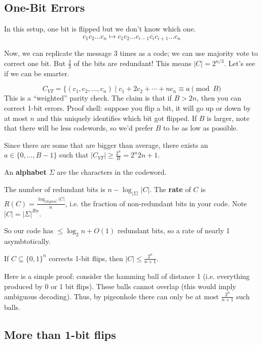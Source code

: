 \subsection{One-Bit Errors}

In this setup, one bit is flipped but we don't know which one.
\[ c_1 c_2 \dots c_n \mapsto c_1 c_2 \dots c_{i - 1} \overline{c_i} c_{i + 1} \dots c_n \]

Now, we can replicate the message 3 times as a code; we can use majority vote to correct one bit. But $\frac{2}{3}$ of the bits are redundant!
This means $|C| = 2^{n/3}$.
Let's see if we can be smarter.

\[ C_{VT} = \{ (c_1, c_2, \dots, c_n) \mid c_1 + 2c_2 + \cdots + n c_n \equiv a \pmod B \]
This is a ``weighted'' parity check. The claim is that if $B > 2n$, then you can correct 1-bit errors. Proof shell:
suppose you flip a bit, it will go up or down by at most $n$ and this uniquely identifies which bit got flipped. If $B$ is larger, note that there
will be less codewords, so we'd prefer $B$ to be as low as possible.

Since there are some that are bigger than average, there exists an $a \in \{0, \dots, B - 1\}$ such that $|C_{VT}| \geq \frac{2^n}{B} = 2^{n}{2n + 1}$.

\begin{definition}[Rate]
    An \textbf{alphabet} $\Sigma$ are the characters in the codeword.

    The number of redundant bits is $n - \log_|\Sigma| |C|$.
    The \textbf{rate} of $C$ is $R(C) = \frac{\log_{|Sigma|} |C|}{n}$,
    i.e. the fraction of non-redundant bits in your code.
    Note $|C| = |\Sigma|^{Rn}$.
\end{definition}

So our code has $\leq \log_2 n + O(1)$ redundant bits, so a rate of nearly 1 asymbtotically.

\begin{theorem}
    If $C \subseteq \{0, 1\}^n$ corrects 1-bit flips, then $|C| \leq \frac{2^n}{n + 1}$.
\end{theorem}

Here is a simple proof: consider the hamming ball of distance 1 (i.e. everything produced by 0 or 1 bit flips). These balls cannot overlap
(this would imply ambiguous decoding). Thus, by pigeonhole there can only be at most $\frac{2^n}{n + 1}$ such balls.

\subsection{More than 1-bit flips}

